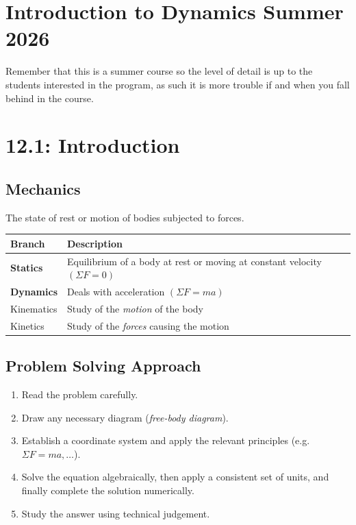 \documentclass{wilson-summary}
\begin{document}
\section*{Introduction to Dynamics Summer 2026}
Remember that this is a summer course so the level of detail is up to the students interested in the program, as such it is more trouble if and when you fall behind in the course.

\section*{12.1: \quad Introduction}

\subsection*{Mechanics}
 The state of rest or motion of bodies subjected to forces.

\vspace{4pt}
\noindent
\begin{tabular}{@{}p{} p{}@{}}
\toprule
\textbf{Branch} & \textbf{Description} \\
\midrule
\textbf{Statics}   & Equilibrium of a body at rest or moving at constant velocity $(\Sigma F = 0)$ \\[4pt]
\textbf{Dynamics}  & Deals with acceleration $(\Sigma F = ma)$ \\[2pt]
\quad Kinematics   & Study of the \emph{motion} of the body \\[2pt]
\quad Kinetics     & Study of the \emph{forces} causing the motion \\
\bottomrule
\end{tabular}
 


\subsection*{Problem Solving Approach}
\begin{enumerate}[leftmargin=1.6em, itemsep=2pt]
  \item Read the problem carefully.
  \item Draw any necessary diagram (\emph{free-body diagram}).
  \item Establish a coordinate system and apply the relevant principles
        (e.g.\ $\Sigma F = ma, \ldots$).
  \item Solve the equation algebraically, then apply a consistent set of units,
        and finally complete the solution numerically.
  \item Study the answer using technical judgement.
\end{enumerate}
\end{document}
